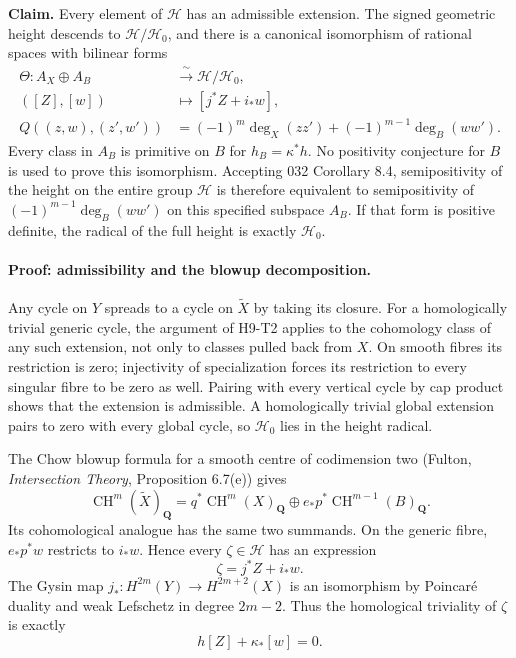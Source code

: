 \documentclass[11pt,a4paper]{article}
\begin{document}
\textbf{Claim.} Every element of $\mathcal H$ has an admissible extension.
The signed geometric height descends to $\mathcal H/\mathcal H_0$, and
there is a canonical isomorphism of rational spaces with bilinear forms
\[
 \begin{split}
 \Theta:A_X\oplus A_B&\xrightarrow{\ \sim\ }
                          \mathcal H/\mathcal H_0,\\
 ([Z],[w])&\longmapsto[j^*Z+i_*w],\\
 Q((z,w),(z',w'))&=(-1)^m\deg_X(zz')
                    +(-1)^{m-1}\deg_B(ww').
 \end{split}                                                   \tag{H9.18}
\]
Every class in $A_B$ is primitive on $B$ for $h_B=\kappa^*h$.
No positivity conjecture for $B$ is used to prove this isomorphism.
Accepting 032 Corollary 8.4, semipositivity of the height on the entire
group $\mathcal H$ is therefore equivalent to semipositivity of
$(-1)^{m-1}\deg_B(ww')$ on this specified subspace $A_B$.
If that form is positive definite, the radical of the full height is
exactly $\mathcal H_0$.

\paragraph{Proof: admissibility and the blowup decomposition.}
Any cycle on $Y$ spreads to a cycle on $\widetilde X$ by taking its closure.
For a homologically trivial generic cycle, the argument of H9-T2 applies
to the cohomology class of any such extension, not only to classes pulled
back from $X$. On smooth fibres its restriction is zero; injectivity of
specialization forces its restriction to every singular fibre to be zero
as well. Pairing with every vertical cycle by cap product shows that the
extension is admissible. A homologically trivial global extension pairs
to zero with every global cycle, so $\mathcal H_0$ lies in the height
radical.

The Chow blowup formula for a smooth centre of codimension two
(Fulton, \emph{Intersection Theory}, Proposition 6.7(e)) gives
\[
 \operatorname{CH}^m(\widetilde X)_{\mathbf Q}
   =q^*\operatorname{CH}^m(X)_{\mathbf Q}
      \oplus e_*p^*\operatorname{CH}^{m-1}(B)_{\mathbf Q}.        \tag{H9.19}
\]
Its cohomological analogue has the same two summands. On the generic
fibre, $e_*p^*w$ restricts to $i_*w$. Hence every $\zeta\in\mathcal H$
has an expression
\[
 \zeta=j^*Z+i_*w.
\]
The Gysin map $j_*:H^{2m}(Y)\to H^{2m+2}(X)$ is an isomorphism by
Poincar\'e duality and weak Lefschetz in degree $2m-2$. Thus the
homological triviality of $\zeta$ is exactly
\[
 h[Z]+\kappa_*[w]=0.                                           \tag{H9.20}
\]
\end{document}
